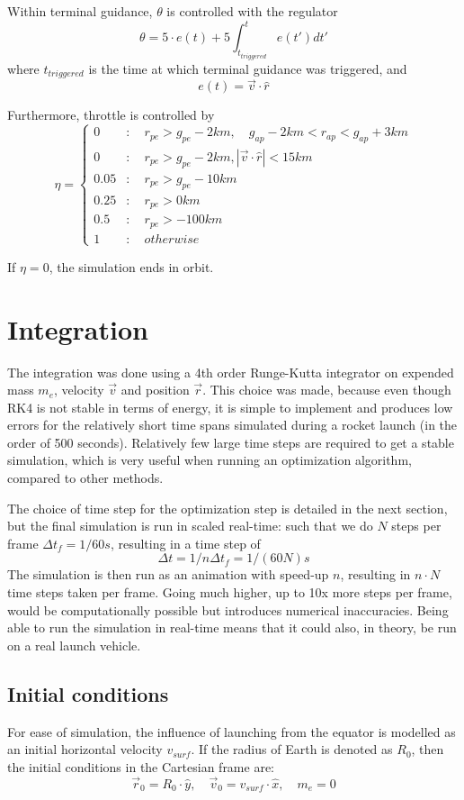 \documentclass[11pt]{article}
\begin{document}
Within terminal guidance, $\theta$ is controlled with the regulator 
$$
\theta = 5 \cdot e(t) + 5 \int_{t_{triggered}}^t e(t') dt'
$$
where $t_{triggered}$ is the time at which terminal guidance was triggered, and
$$
e(t) = \vec{v} \cdot \hat{r}
$$

Furthermore, throttle is controlled by
$$
\eta = \begin{cases}
0 & : \quad r_{pe} > g_{pe} - 2 km, \quad g_{ap} - 2 km < r_{ap} < g_{ap} + 3 km \\
0 & : \quad r_{pe} > g_{pe} - 2 km, \left| \vec{v} \cdot \hat{r} \right| < 15 km \\
0.05 & : \quad r_{pe} > g_{pe} - 10 km \\
0.25 & : \quad r_{pe} > 0 km \\
0.5 & : \quad r_{pe} > -100 km \\
1 & :  \quad otherwise
\end{cases}
$$

If $\eta = 0$, the simulation ends in orbit.

\section{Integration}
The integration was done using a 4th order Runge-Kutta integrator on expended mass $m_e$, velocity $\vec{v}$ and position $\vec{r}$. 
This choice was made, because even though RK4 is not stable in terms of energy, it is simple to implement and produces low errors for the relatively short time spans simulated during a rocket launch (in the order of 500 seconds).
Relatively few large time steps are required to get a stable simulation, which is very useful when running an optimization algorithm, compared to other methods.

The choice of time step for the optimization step is detailed in the next section, but the final simulation is run in scaled real-time: such that we do $N$ steps per frame $\Delta t_f = 1/60 s$, resulting
in a time step of 
$$
\Delta t = 1/n \Delta  t_f = 1/(60N) s
$$ 
The simulation is then run as an animation with speed-up $n$, resulting in $n \cdot N$ time steps taken per frame. 
Going much higher, up to 10x more steps per frame, would be computationally possible but introduces
numerical inaccuracies. Being able to run the simulation in real-time means that it could also, in theory, be run on a real launch vehicle.

\subsection{Initial conditions}
For ease of simulation, the influence of launching from the equator is modelled as an initial horizontal velocity $v_{surf}$.
If the radius of Earth is denoted as $R_0$, then the initial conditions in the Cartesian frame are:
$$
\vec{r}_0 = R_0 \cdot \hat{y}, \quad \vec{v}_0 = v_{surf} \cdot \hat{x}, \quad m_e = 0
$$
\end{document}
